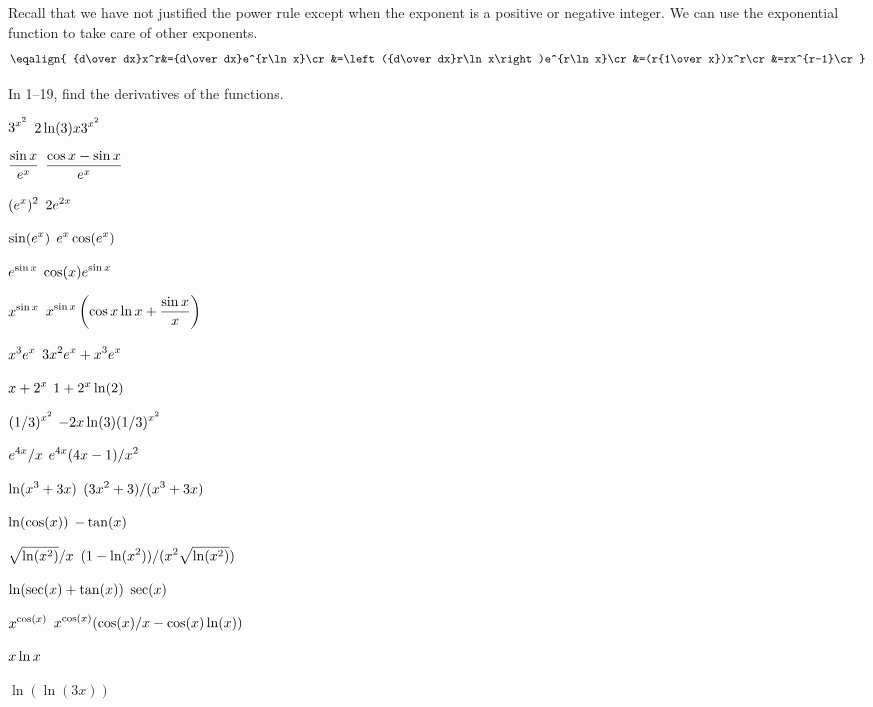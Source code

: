\example Recall that we have not justified the power
rule except when the exponent is a positive or negative integer. We
can use the exponential function to take care of other exponents.
$$\eqalign{
{d\over dx}x^r&={d\over dx}e^{r\ln x}\cr
&=\left({d\over dx}r\ln x\right)e^{r\ln x}\cr
&=(r{1\over x})x^r\cr
&=rx^{r-1}\cr
}$$
\vskip-10pt
\endexample

\exercises
In 1--19, find the derivatives of the functions.

\twocol

\exercise $\displaystyle 3^{x^2}$
\answer $\displaystyle 2\ln(3)x3^{x^2}$
\endanswer
\endexercise

\exercise $\displaystyle {\sin x \over e^x}$
\answer $\displaystyle {\cos x-\sin x \over e^x}$
\endanswer
\endexercise

\exercise $\displaystyle (e^x)^2$
\answer $\displaystyle 2e^{2x}$
\endanswer
\endexercise

\exercise $\displaystyle \sin(e^x)$
\answer $\displaystyle e^x\cos(e^x)$
\endanswer
\endexercise

\exercise $\displaystyle e^{\sin x}$
\answer $\displaystyle  \cos (x) e^{\sin x}$
\endanswer
\endexercise

\exercise $\displaystyle x^{\sin x}$
\answer $\displaystyle x^{\sin x}\left(\cos x\ln x+{\sin x\over x}\right)$
\endanswer
\endexercise

\exercise  $\displaystyle x^3e^x$
\answer $\displaystyle 3x^2e^x+x^3e^x$
\endanswer
\endexercise

\exercise  $\displaystyle x+2^x$
\answer $\displaystyle 1+2^x\ln(2)$
\endanswer
\endexercise

\exercise  $\displaystyle (1/3)^{x^2}$
\answer $\displaystyle -2x\ln(3)(1/3)^{x^2}$
\endanswer
\endexercise

\exercise  $\displaystyle e^{4x}/x$
\answer $\displaystyle e^{4x}(4x-1)/x^2$
\endanswer
\endexercise

\exercise  $\displaystyle \ln(x^3+3x)$
\answer $\displaystyle (3x^2+3)/(x^3+3x)$
\endanswer
\endexercise

\exercise  $\displaystyle \ln(\cos(x))$
\answer $\displaystyle -\tan(x)$
\endanswer
\endexercise

\exercise  $\displaystyle\sqrt{\ln(x^2)}/x$
\answer $\displaystyle (1-\ln(x^2))/(x^2\sqrt{\ln(x^2)})$
\endanswer
\endexercise

\exercise  $\displaystyle \ln(\sec(x) + \tan(x))$
\answer $\displaystyle \sec(x)$
\endanswer
\endexercise

\exercise  $\displaystyle x^{\cos(x)}$
\answer $\displaystyle x^{\cos(x)}(\cos(x)/x-\cos(x)\ln(x))$
\endanswer
\endexercise

\exercise $\displaystyle x\ln x$
\endexercise

\exercise $\ln (\ln (3x) )$
\endexercise

